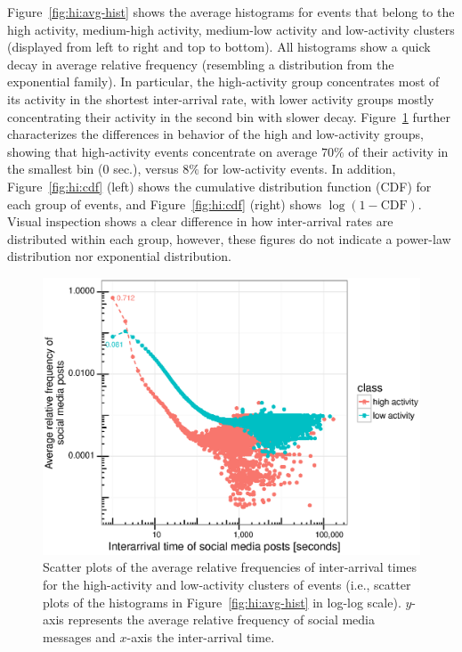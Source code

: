Figure~\ref{fig:hi:avg-hist} shows the average histograms for events that belong
to the high activity, medium-high activity, medium-low activity and low-activity
clusters (displayed from left to right and top to bottom). 
%
All histograms show a quick decay in average relative frequency (resembling a
distribution from the exponential family). 
%
In particular, the high-activity group concentrates most of its activity in the
shortest inter-arrival rate, with lower activity groups mostly concentrating
their activity in the second bin with slower decay. 
%
Figure~\ref{fig:hi:scatter} further characterizes the differences in behavior of
the high and low-activity groups, showing that high-activity events concentrate
on average $70\%$ of their activity in the smallest bin ($0$ sec.), versus
$8\%$ for low-activity events. 
%
In addition, Figure~\ref{fig:hi:cdf} (left) shows the cumulative distribution
function (CDF) for each group of events, and Figure~\ref{fig:hi:cdf} (right)
shows $\log{(1 - \mathrm{CDF})}$. 
%
Visual inspection shows a clear difference in how inter-arrival rates are
distributed within each group, however, these figures do not indicate a
power-law distribution nor exponential distribution.%

\begin{figure}[!htb]
  \centering
    \includegraphics[width=\textwidth]{figures/high-activity/fig5}
  \caption[Relative frequencies of inter-arrival times]{Scatter plots of the
average relative frequencies of inter-arrival times for the high-activity and
low-activity clusters of events (i.e., scatter plots of the histograms in
Figure~\ref{fig:hi:avg-hist} in log-log scale). $y$-axis represents the average
relative frequency of social media messages and $x$-axis the inter-arrival time.}
\label{fig:hi:scatter}
\end{figure}

